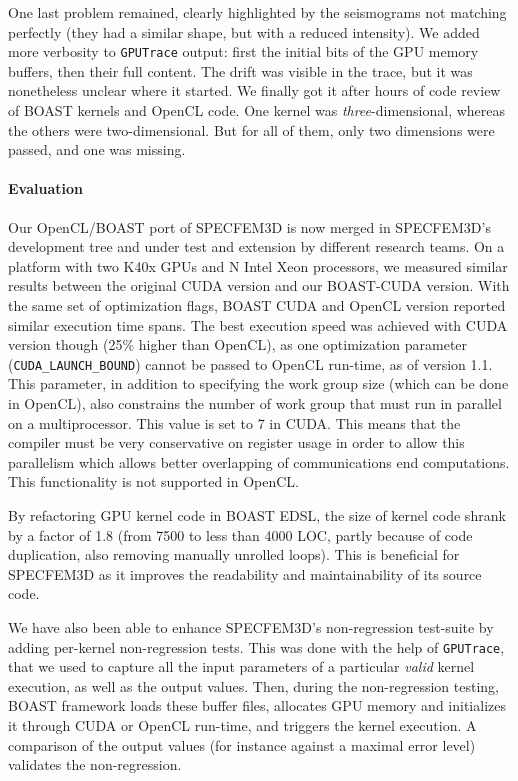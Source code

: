 \documentclass{IEEEtran}
\newcommand{\code}[1]{\texttt{#1}}
\begin{document}
One last problem remained, clearly highlighted by the seismograms not
matching perfectly (they had a similar shape, but with a reduced
intensity). We added more verbosity to \code{GPUTrace} output: first
the initial bits of the GPU memory buffers, then their full
content. The drift was visible in the trace, but it was nonetheless
unclear where it started. We finally got it after hours of code review
of BOAST kernels and OpenCL code. One kernel was
\emph{three}-dimensional, whereas the others were two-dimensional. But
for all of them, only two dimensions were passed, and one was
missing.

\paragraph{Evaluation} Our OpenCL/BOAST port of SPECFEM3D is now
merged in SPECFEM3D's development tree and under test and extension by
different research teams. On a platform with two K40x GPUs and N Intel
Xeon processors, we measured similar results between the original
CUDA version and our BOAST-CUDA version. With the same set of
optimization flags, BOAST CUDA and OpenCL version reported similar
execution time spans. The best execution speed was achieved with CUDA
version though (25\% higher than OpenCL), as one optimization parameter
(\code{CUDA\_LAUNCH\_BOUND}) cannot be passed to OpenCL run-time, as of version
1.1. This parameter, in addition to specifying the work group size (which can
be done in OpenCL), also constrains the number of work group that must run in
parallel on a multiprocessor. This value is set to 7 in CUDA. This means that
the compiler must be very conservative on register usage in order to allow this
parallelism which allows better overlapping of communications end computations.
This functionality is not supported in OpenCL.

By refactoring GPU kernel code in BOAST EDSL, the size of kernel code
shrank by a factor of 1.8 (from 7500 to less than 4000 LOC, partly
because of code duplication, also removing manually unrolled
loops). This is beneficial for SPECFEM3D as it improves the readability
and maintainability of its source code.

We have also been able to enhance SPECFEM3D's non-regression test-suite
by adding per-kernel non-regression tests. This was done with the help
of \code{GPUTrace}, that we used to capture all the input parameters
of a particular \emph{valid} kernel execution, as well as the output
values. Then, during the non-regression testing, BOAST framework
loads these buffer files, allocates GPU memory and initializes it through
CUDA or OpenCL run-time, and triggers the kernel execution. A comparison
of the output values (for instance against a maximal error level)
validates the non-regression.
\end{document}
